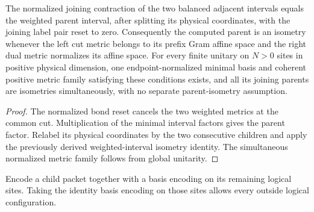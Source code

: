 \begin{lemma}
    \label{thm:mpu_actual_parent_isometry}
    \leanok
    The normalized joining contraction of the two balanced adjacent
    intervals equals the weighted parent interval, after
    splitting its physical coordinates, with the joining label pair
    reset to zero. Consequently the computed parent is an isometry
    whenever the left cut metric belongs to its prefix Gram affine
    space and the right dual metric normalizes its affine space.
    For every finite unitary on $N>0$ sites in positive physical
    dimension, one endpoint-normalized minimal basis and coherent
    positive metric family satisfying these conditions exists, and
    all its joining parents are isometries simultaneously, with no
    separate parent-isometry assumption.
\end{lemma}
\begin{proof}\leanok
    The normalized bond reset cancels the two weighted metrics at
    the common cut. Multiplication of the minimal interval
    factors gives the parent factor. Relabel its physical coordinates
    by the two consecutive children and apply the previously derived
    weighted-interval isometry identity. The simultaneous normalized
    metric family follows from global unitarity.
\end{proof}

\begin{definition}
    \label{def:mpu_supported_child_basis}
    \leanok
    Encode a child packet together with a basis encoding on its
    remaining logical sites. Taking the identity basis encoding
    on those sites allows every outside logical configuration.
\end{definition}

